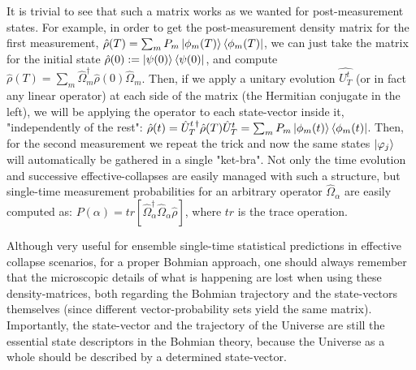 \documentclass[11pt, a4paper]{article} %
\begin{document}
It is trivial to see that such a matrix works as we wanted for post-measurement states. For example, in order to get the post-measurement density matrix for the first measurement, $\hat{\rho}(T) = \sum_m P_m\ket{\phi_m(T)}\bra{\phi_m(T)}$, we can just take the matrix for the initial state $\hat{\rho}(0):=\ket{\psi(0)}\bra{\psi(0)}$, and compute $\hat{\rho}(T)=\sum_m \hat{\Omega}_m^\dagger\hat{\rho}(0)\hat{\Omega}_m$. Then, if we apply a unitary evolution $\hat{U_T^t}$ (or in fact any linear operator) at each side of the matrix (the Hermitian conjugate in the left), we will be applying the operator to each state-vector inside it, "independently of the rest": $\hat{\rho}(t)=\hat{U}_T^{t\,\dagger}\hat{\rho}(T)\hat{U}_T^{t}=\sum_m P_m\ket{\phi_m(t)}\bra{\phi_m(t)}$. Then, for the second measurement we repeat the trick and now the same states $\ket{\varphi_j}$ will automatically be gathered in a single "ket-bra". Not only the time evolution and successive effective-collapses are easily managed with such a structure, but single-time measurement probabilities for an arbitrary operator $\hat{\Omega}_\alpha$ are easily computed as: $P(\alpha)=tr[\hat{\Omega}_\alpha^\dagger \hat{\Omega}_\alpha\hat{\rho}]$, where $tr$ is the trace operation.

Although very useful for ensemble single-time statistical predictions in effective collapse scenarios, for a proper Bohmian approach, one should always remember that the microscopic details of what is happening are lost when using these density-matrices, both regarding the Bohmian trajectory and the state-vectors themselves (since different vector-probability sets yield the same matrix). Importantly, the state-vector and the trajectory of the Universe are still the essential state descriptors in the Bohmian theory, because the Universe as a whole should be described by a determined state-vector.
\end{document}
